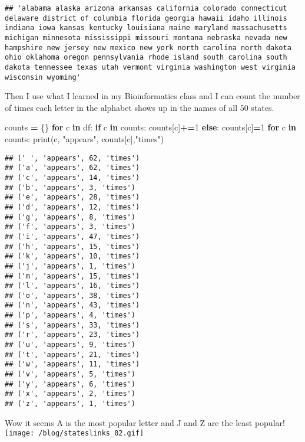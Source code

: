 \documentclass[]{article}
\newenvironment{Shaded}{\begin{snugshade}}{\end{snugshade}}
\newcommand{\BuiltInTok}[1]{#1}
\newcommand{\ControlFlowTok}[1]{\textcolor[rgb]{0.13,0.29,0.53}{\textbf{#1}}}
\newcommand{\DecValTok}[1]{\textcolor[rgb]{0.00,0.00,0.81}{#1}}
\newcommand{\KeywordTok}[1]{\textcolor[rgb]{0.13,0.29,0.53}{\textbf{#1}}}
\newcommand{\NormalTok}[1]{#1}
\newcommand{\OperatorTok}[1]{\textcolor[rgb]{0.81,0.36,0.00}{\textbf{#1}}}
\newcommand{\StringTok}[1]{\textcolor[rgb]{0.31,0.60,0.02}{#1}}
\begin{document}
\begin{verbatim}
## 'alabama alaska arizona arkansas california colorado connecticut delaware district of columbia florida georgia hawaii idaho illinois indiana iowa kansas kentucky louisiana maine maryland massachusetts michigan minnesota mississippi missouri montana nebraska nevada new hampshire new jersey new mexico new york north carolina north dakota ohio oklahoma oregon pennsylvania rhode island south carolina south dakota tennessee texas utah vermont virginia washington west virginia wisconsin wyoming'
\end{verbatim}

Then I use what I learned in my Bioinformatics class and I can count the
number of times each letter in the alphabet shows up in the names of all
50 states.

\begin{Shaded}
\begin{Highlighting}[]
\NormalTok{counts }\OperatorTok{=}\NormalTok{ \{\}            }
\ControlFlowTok{for}\NormalTok{ c }\KeywordTok{in}\NormalTok{ df:     }
    \ControlFlowTok{if}\NormalTok{ c }\KeywordTok{in}\NormalTok{ counts:    }
\NormalTok{        counts[c]}\OperatorTok{+=}\DecValTok{1}   
    \ControlFlowTok{else}\NormalTok{:}
\NormalTok{        counts[c]}\OperatorTok{=}\DecValTok{1}    
\ControlFlowTok{for}\NormalTok{ c }\KeywordTok{in}\NormalTok{ counts:}
    \BuiltInTok{print}\NormalTok{(c, }\StringTok{"appears"}\NormalTok{, counts[c],}\StringTok{"times"}\NormalTok{)}
\end{Highlighting}
\end{Shaded}

\begin{verbatim}
## (' ', 'appears', 62, 'times')
## ('a', 'appears', 62, 'times')
## ('c', 'appears', 14, 'times')
## ('b', 'appears', 3, 'times')
## ('e', 'appears', 28, 'times')
## ('d', 'appears', 12, 'times')
## ('g', 'appears', 8, 'times')
## ('f', 'appears', 3, 'times')
## ('i', 'appears', 47, 'times')
## ('h', 'appears', 15, 'times')
## ('k', 'appears', 10, 'times')
## ('j', 'appears', 1, 'times')
## ('m', 'appears', 15, 'times')
## ('l', 'appears', 16, 'times')
## ('o', 'appears', 38, 'times')
## ('n', 'appears', 43, 'times')
## ('p', 'appears', 4, 'times')
## ('s', 'appears', 33, 'times')
## ('r', 'appears', 23, 'times')
## ('u', 'appears', 9, 'times')
## ('t', 'appears', 21, 'times')
## ('w', 'appears', 11, 'times')
## ('v', 'appears', 5, 'times')
## ('y', 'appears', 6, 'times')
## ('x', 'appears', 2, 'times')
## ('z', 'appears', 1, 'times')
\end{verbatim}

Wow it seems A is the most popular letter and J and Z are the least
popular!
\texttt{[image: /blog/stateslinks\_02.gif]}
\end{document}

